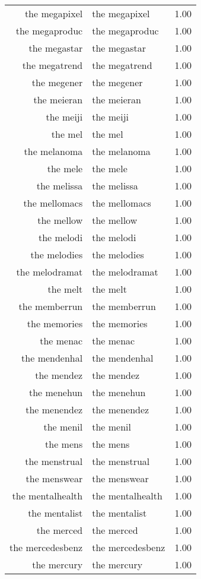 \begin{table}[ht]
\begin{tabular}{rlr}
  the megapixel & the megapixel & 1.00 \\ 
  the megaproduc & the megaproduc & 1.00 \\ 
  the megastar & the megastar & 1.00 \\ 
  the megatrend & the megatrend & 1.00 \\ 
  the megener & the megener & 1.00 \\ 
  the meieran & the meieran & 1.00 \\ 
  the meiji & the meiji & 1.00 \\ 
  the mel & the mel & 1.00 \\ 
  the melanoma & the melanoma & 1.00 \\ 
  the mele & the mele & 1.00 \\ 
  the melissa & the melissa & 1.00 \\ 
  the mellomacs & the mellomacs & 1.00 \\ 
  the mellow & the mellow & 1.00 \\ 
  the melodi & the melodi & 1.00 \\ 
  the melodies & the melodies & 1.00 \\ 
  the melodramat & the melodramat & 1.00 \\ 
  the melt & the melt & 1.00 \\ 
  the memberrun & the memberrun & 1.00 \\ 
  the memories & the memories & 1.00 \\ 
  the menac & the menac & 1.00 \\ 
  the mendenhal & the mendenhal & 1.00 \\ 
  the mendez & the mendez & 1.00 \\ 
  the menehun & the menehun & 1.00 \\ 
  the menendez & the menendez & 1.00 \\ 
  the menil & the menil & 1.00 \\ 
  the mens & the mens & 1.00 \\ 
  the menstrual & the menstrual & 1.00 \\ 
  the menswear & the menswear & 1.00 \\ 
  the mentalhealth & the mentalhealth & 1.00 \\ 
  the mentalist & the mentalist & 1.00 \\ 
  the merced & the merced & 1.00 \\ 
  the mercedesbenz & the mercedesbenz & 1.00 \\ 
  the mercury & the mercury & 1.00 \\ 

\end{tabular}
\end{table}
